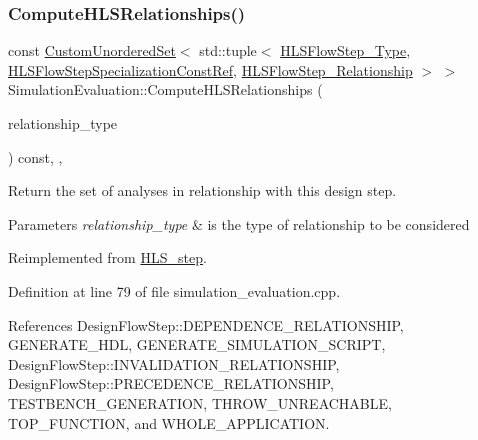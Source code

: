\subsubsection{\texorpdfstring{Compute\+H\+L\+S\+Relationships()}{ComputeHLSRelationships()}}
{\footnotesize\ttfamily const \hyperlink{classCustomUnorderedSet}{Custom\+Unordered\+Set}$<$ std\+::tuple$<$ \hyperlink{hls__step_8hpp_ada16bc22905016180e26fc7e39537f8d}{H\+L\+S\+Flow\+Step\+\_\+\+Type}, \hyperlink{hls__step_8hpp_a5fdd2edf290c196531d21d68e13f0e74}{H\+L\+S\+Flow\+Step\+Specialization\+Const\+Ref}, \hyperlink{hls__step_8hpp_a3ad360b9b11e6bf0683d5562a0ceb169}{H\+L\+S\+Flow\+Step\+\_\+\+Relationship} $>$ $>$ Simulation\+Evaluation\+::\+Compute\+H\+L\+S\+Relationships (\begin{DoxyParamCaption}\item[{const \hyperlink{classDesignFlowStep_a723a3baf19ff2ceb77bc13e099d0b1b7}{Design\+Flow\+Step\+::\+Relationship\+Type}}]{relationship\+\_\+type }\end{DoxyParamCaption}) const\hspace{0.3cm}{\ttfamily [override]}, {\ttfamily [protected]}, {\ttfamily [virtual]}}



Return the set of analyses in relationship with this design step. 


\begin{DoxyParams}{Parameters}
{\em relationship\+\_\+type} & is the type of relationship to be considered \\
\hline
\end{DoxyParams}


Reimplemented from \hyperlink{classHLS__step_aed0ce8cca9a1ef18e705fc1032ad4de5}{H\+L\+S\+\_\+step}.



Definition at line 79 of file simulation\+\_\+evaluation.\+cpp.



References Design\+Flow\+Step\+::\+D\+E\+P\+E\+N\+D\+E\+N\+C\+E\+\_\+\+R\+E\+L\+A\+T\+I\+O\+N\+S\+H\+IP, G\+E\+N\+E\+R\+A\+T\+E\+\_\+\+H\+DL, G\+E\+N\+E\+R\+A\+T\+E\+\_\+\+S\+I\+M\+U\+L\+A\+T\+I\+O\+N\+\_\+\+S\+C\+R\+I\+PT, Design\+Flow\+Step\+::\+I\+N\+V\+A\+L\+I\+D\+A\+T\+I\+O\+N\+\_\+\+R\+E\+L\+A\+T\+I\+O\+N\+S\+H\+IP, Design\+Flow\+Step\+::\+P\+R\+E\+C\+E\+D\+E\+N\+C\+E\+\_\+\+R\+E\+L\+A\+T\+I\+O\+N\+S\+H\+IP, T\+E\+S\+T\+B\+E\+N\+C\+H\+\_\+\+G\+E\+N\+E\+R\+A\+T\+I\+ON, T\+H\+R\+O\+W\+\_\+\+U\+N\+R\+E\+A\+C\+H\+A\+B\+LE, T\+O\+P\+\_\+\+F\+U\+N\+C\+T\+I\+ON, and W\+H\+O\+L\+E\+\_\+\+A\+P\+P\+L\+I\+C\+A\+T\+I\+ON.

